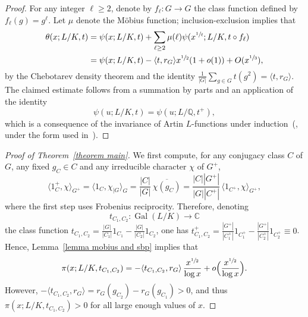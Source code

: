 \documentclass[JEP,XML,SOM,Unicode,NoEqCountersInSection,NoFloatCountersInSection,published]{cedram}
\theoremstyle{definition}
\DeclareMathOperator{\Gal}{Gal}
\newcommand{\Q}{\mathbb Q}
\begin{document}
\begin{proof}
For any integer $\ell\geq 2$, denote by $f_\ell\colon G\to G$ the class function defined by $f_\ell(g)=g^\ell$. Let $\mu$ denote the Möbius function; inclusion-exclusion implies that
\begin{align*}
\theta(x;L/K,t) &=\psi(x;L/K,t) + \sum_{\ell \geq 2} \mu(\ell) \psi(x^{\sfrac 1\ell};L/K,t\circ f_\ell) \\
&= \psi(x;L/K,t)- \langle t,r_G \rangle x^{\sfrac 12}(1+o(1))+O(x^{\sfrac 13}),
\end{align*}
by the Chebotarev density theorem and the identity $ \frac 1{|G|}\sum_{g\in G} t(g^2) = \langle t,r_G\rangle . $
The claimed estimate follows from a summation by parts and an application of the identity \[\psi(u;L/K,t)=\psi(u;L/\Q,t^+),\] which is a consequence of the invariance of Artin $L$-functions under induction~(\cite[\S2]{Artin}, under the form used in~\cite[Prop.\,3.11]{FJ}).
\end{proof}

\begin{proof}[Proof of Theorem~\ref{theorem main}]
We first compute, for any conjugacy class $C$ of $G$, any fixed $g_C\in C$ and any irreducible character $\chi$ of $G^+$,
\[
\langle 1_{C}^+,\chi\rangle_{G^+}=
\langle 1_C,\chi_{|G}\rangle_G=\frac{|C|}{|G|}\,\overline{\chi(g_C)}=\frac{|C| |G^+|}{|G| |C^+|}\,\langle 1_{C^+},\chi\rangle_{G^+},
\]
where the first step uses Frobenius reciprocity. Therefore, denoting
\[
t_{C_1,C_2}\colon\Gal(L/K)\to \mathbb C
\]
the class function $t_{C_1,C_2}=\frac{|G|}{|C_1|}1_{C_1}-\frac{|G|}{|C_2|}1_{C_2}$, one has $t_{C_1,C_2}^+ =\frac{|G^+|}{|C_1^+|}1_{C_1^+}-\frac{|G^+|}{|C_2^+|}1_{C_2^+} \equiv 0$. Hence, Lemma~\ref{lemma mobius and sbp} implies that
\[ \pi(x;L/K,t_{C_1,C_2}) =-\langle t_{C_1,C_2},r_G \rangle\, \frac{x^{\sfrac 12}}{\log x} + o\Big(\frac{x^{\sfrac 12}}{\log x}\Big). \]
However, $-\langle t_{C_1,C_2},r_G \rangle = r_G(g_{C_2})-r_G(g_{C_1})>0 $, and thus $ \pi(x;L/K,t_{C_1,C_2}) >0 $ for all large enough values of $x$.
\end{proof}
\end{document}
